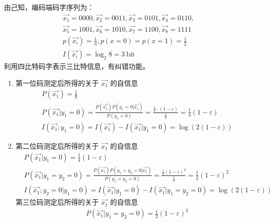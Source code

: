 \begin{remark}
    \begin{solution}
        由己知，编码端码字序列为：
        \begin{gather*}
            \overrightarrow{x_{1}}=0000, \overrightarrow{x_{2}}=0011, \overrightarrow{x_{3}}=0101, \overrightarrow{x_{4}}=0110,\\
            \overrightarrow{x_{5}}=1001, \overrightarrow{x_{6}}=1010, \overrightarrow{x_{7}}=1100, \overrightarrow{x_{8}}=1111\\
            p(\overrightarrow{x_i}) = \frac{1}{n}, p(x = 0) = p(x = 1) = \frac{1}{2} \\I(\overrightarrow{x_i}) = \log_2 8 = \SI{3}{\mathrm{bit}}
        \end{gather*}
        利用四比特码字表示三比特信息，有纠错功能。
        \begin{enumerate}
            \item 第一位码测定后所得的关于 $\vec{x_1}$ 的自信息 
            \begin{align*}
                &P(\overrightarrow{x_1}) = \frac{1}{8}\\
                &P(\overrightarrow{x_1} | y_1 = 0) = \frac{P(\overrightarrow{x_1})P(y_1 = 0 | \overrightarrow{x_1})}{P(y_1 = 0)} = \frac{\frac{1}{8} \cdot (1 - \varepsilon)}{\frac{1}{2}} = \frac{1}{4}(1 - \varepsilon) \\
                &I(\overrightarrow{x_1}; y_1 = 0) = I(\overrightarrow{x_1}) - I(\overrightarrow{x_1} | y_1 = 0) = \log(2(1 - \varepsilon))
            \end{align*}
            \item 第二位码测定后所得的关于 $\vec{x_1}$ 的自信息
            \begin{align*}
                &P(\overrightarrow{x_1} | y_1 = 0) = \frac{1}{4}(1 - \varepsilon) \\
                &P(\overrightarrow{x_1} | y_1 = y_2 = 0) = \frac{P(\overrightarrow{x_1}) P(y_1 = y_2 = 0|\overrightarrow{x_1})}{P(y_1 = y_2 = 0)} = \frac{\frac{1}{8} (1 - \varepsilon)^2}{\frac{1}{4}} = \frac{1}{2} (1 - \varepsilon)^2\\
                &I(\overrightarrow{x_1}; y_2 = 0 | y_1 = 0) = I(\overrightarrow{x_1} | y_1 = 0) - I(\overrightarrow{x_1} | y_1 = y_2 = 0) = \log(2(1 - \varepsilon))
            \end{align*}
            第三位码测定后所得的关于 $\vec{x_1}$ 的自信息
            \begin{align*}
                &P(\overrightarrow{x_1} | y_1 = y_2 = 0) = \frac{1}{2} (1 - \varepsilon)^2\\

\end{align*}
\end{enumerate}
\end{solution}
\end{remark}
